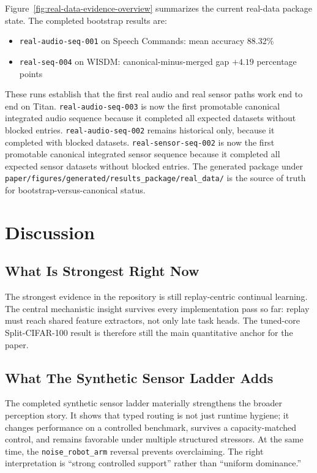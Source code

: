 \documentclass{article}
\begin{document}
Figure~\ref{fig:real-data-evidence-overview} summarizes the current real-data package state. The completed bootstrap results are:
\begin{itemize}[leftmargin=*]
  \item \texttt{real-audio-seq-001} on Speech Commands: mean accuracy 88.32\%
  \item \texttt{real-seq-004} on WISDM: canonical-minus-merged gap $+4.19$ percentage points
\end{itemize}
These runs establish that the first real audio and real sensor paths work end to end on Titan. \texttt{real-audio-seq-003} is now the first promotable canonical integrated audio sequence because it completed all expected datasets without blocked entries. \texttt{real-audio-seq-002} remains historical only, because it completed with blocked datasets. \texttt{real-sensor-seq-002} is now the first promotable canonical integrated sensor sequence because it completed all expected sensor datasets without blocked entries. The generated package under \texttt{paper/figures/generated/results\_package/real\_data/} is the source of truth for bootstrap-versus-canonical status.

\section{Discussion}

\subsection{What Is Strongest Right Now}

The strongest evidence in the repository is still replay-centric continual learning. The central mechanistic insight survives every implementation pass so far: replay must reach shared feature extractors, not only late task heads. The tuned-core Split-CIFAR-100 result is therefore still the main quantitative anchor for the paper.

\subsection{What The Synthetic Sensor Ladder Adds}

The completed synthetic sensor ladder materially strengthens the broader perception story. It shows that typed routing is not just runtime hygiene; it changes performance on a controlled benchmark, survives a capacity-matched control, and remains favorable under multiple structured stressors. At the same time, the \texttt{noise\_robot\_arm} reversal prevents overclaiming. The right interpretation is ``strong controlled support'' rather than ``uniform dominance.''
\end{document}
